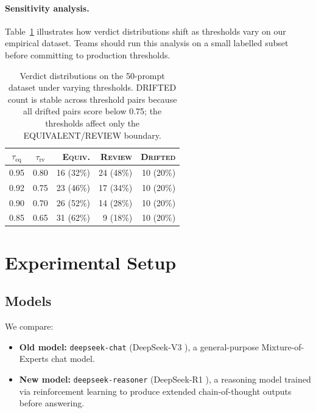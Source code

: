\documentclass[11pt,a4paper]{article}
\begin{document}
\paragraph{Sensitivity analysis.}
Table~\ref{tab:threshold_sensitivity} illustrates how verdict distributions shift
as thresholds vary on our empirical dataset.
Teams should run this analysis on a small labelled subset before committing to
production thresholds.

\begin{table}[h]
\centering
\small
\begin{tabular}{ccrrr}
\toprule
$\tau_\text{eq}$ & $\tau_\text{rv}$ & \textsc{Equiv.} & \textsc{Review} & \textsc{Drifted} \\
\midrule
0.95 & 0.80 & 16 (32\%) & 24 (48\%) & 10 (20\%) \\
0.92 & 0.75 & 23 (46\%) & 17 (34\%) & 10 (20\%) \\
0.90 & 0.70 & 26 (52\%) & 14 (28\%) & 10 (20\%) \\
0.85 & 0.65 & 31 (62\%) & \phantom{0}9 (18\%) & 10 (20\%) \\
\bottomrule
\end{tabular}
\caption{Verdict distributions on the 50-prompt dataset under varying thresholds.
DRIFTED count is stable across threshold pairs because all drifted pairs score
below 0.75; the thresholds affect only the EQUIVALENT/REVIEW boundary.}
\label{tab:threshold_sensitivity}
\end{table}

\section{Experimental Setup}

\subsection{Models}

We compare:
\begin{itemize}
  \item \textbf{Old model:} \texttt{deepseek-chat} (DeepSeek-V3 \citep{deepseekv3}),
    a general-purpose Mixture-of-Experts chat model.
  \item \textbf{New model:} \texttt{deepseek-reasoner} (DeepSeek-R1 \citep{deepseekreasoner}),
    a reasoning model trained via reinforcement learning to produce extended
    chain-of-thought outputs before answering.
\end{itemize}
\end{document}
